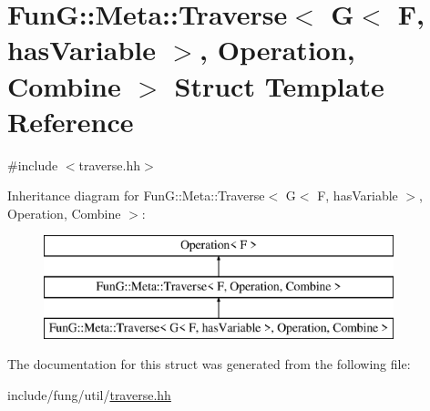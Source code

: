 \hypertarget{structFunG_1_1Meta_1_1Traverse_3_01G_3_01F_00_01hasVariable_01_4_00_01Operation_00_01Combine_01_4}{\section{Fun\-G\-:\-:Meta\-:\-:Traverse$<$ G$<$ F, has\-Variable $>$, Operation, Combine $>$ Struct Template Reference}
\label{structFunG_1_1Meta_1_1Traverse_3_01G_3_01F_00_01hasVariable_01_4_00_01Operation_00_01Combine_01_4}
}


{\ttfamily \#include $<$traverse.\-hh$>$}

Inheritance diagram for Fun\-G\-:\-:Meta\-:\-:Traverse$<$ G$<$ F, has\-Variable $>$, Operation, Combine $>$\-:\begin{figure}[H]
\begin{center}
\leavevmode
\includegraphics[height=3.000000cm]{structFunG_1_1Meta_1_1Traverse_3_01G_3_01F_00_01hasVariable_01_4_00_01Operation_00_01Combine_01_4}
\end{center}
\end{figure}


The documentation for this struct was generated from the following file\-:\begin{DoxyCompactItemize}
\item 
include/fung/util/\hyperlink{traverse_8hh}{traverse.\-hh}\end{DoxyCompactItemize}
